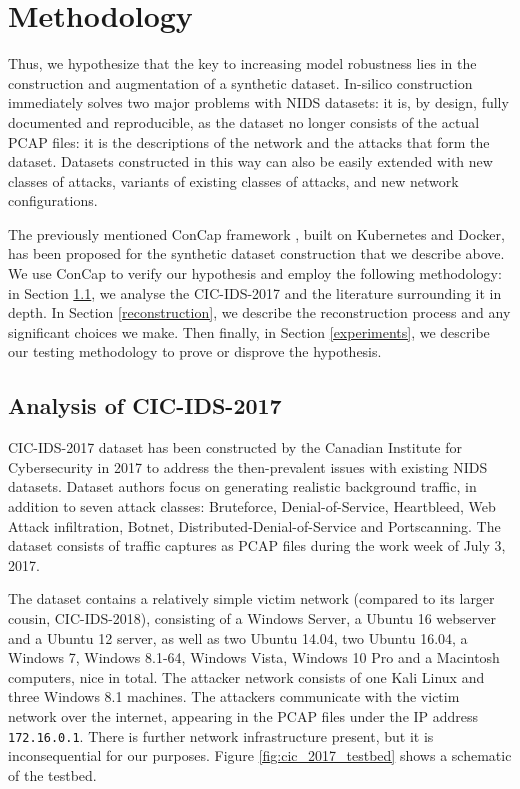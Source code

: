 \section{Methodology}

Thus, we hypothesize that the key to increasing model robustness lies in the construction and augmentation of a synthetic dataset. In-silico construction immediately solves two major problems with NIDS datasets: it is, by design, fully documented and reproducible, as the dataset no longer consists of the actual PCAP files: it is the descriptions of the network and the attacks that form the dataset. Datasets constructed in this way can also be easily extended with new classes of attacks, variants of existing classes of attacks, and new network configurations. 

The previously mentioned ConCap framework \cite{concap}, built on Kubernetes and Docker, has been proposed for the synthetic dataset construction that we describe above. We use ConCap to verify our hypothesis and employ the following methodology: in Section \ref{cic_analysis}, we analyse the CIC-IDS-2017 and the literature surrounding it in depth. In Section \ref{reconstruction}, we describe the reconstruction process and any significant choices we make. Then finally, in Section \ref{experiments}, we describe our testing methodology to prove or disprove the hypothesis.

\subsection{Analysis of CIC-IDS-2017}\label{cic_analysis}
CIC-IDS-2017 dataset has been constructed by the Canadian Institute for Cybersecurity in 2017 to address the then-prevalent issues with existing NIDS datasets. Dataset authors focus on generating realistic background traffic, in addition to seven attack classes: Bruteforce, Denial-of-Service, Heartbleed, Web Attack infiltration, Botnet, Distributed-Denial-of-Service and Portscanning. The dataset consists of traffic captures as PCAP files during the work week of July 3, 2017. 

The dataset contains a relatively simple victim network (compared to its larger cousin, CIC-IDS-2018), consisting of a Windows Server, a Ubuntu 16 webserver and a Ubuntu 12 server, as well as two Ubuntu 14.04, two Ubuntu 16.04, a Windows 7, Windows 8.1-64, Windows Vista, Windows 10 Pro and a Macintosh computers, nice in total. The attacker network consists of one Kali Linux and three Windows 8.1 machines. The attackers communicate with the victim network over the internet, appearing in the PCAP files under the IP address \texttt{172.16.0.1}. There is further network infrastructure present, but it is inconsequential for our purposes. Figure \ref{fig:cic_2017_testbed} \cite{cic_2017} shows a schematic of the testbed.

